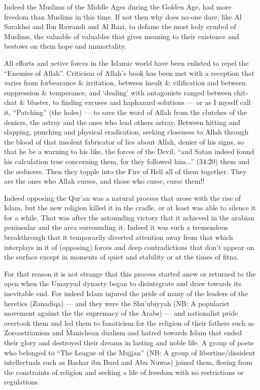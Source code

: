 \documentclass[12pt]{book}
\begin{document}
Indeed the Muslims of the Middle Ages during the Golden Age, had more freedom
than Muslims in this time. If not then why does no-one dare, like Al Sarakhsi
and Ibn Rawandi and Al Razi, to defame the most holy symbol of Muslims, the
valuable of valuables that gives meaning to their existence and bestows on them
hope and immortality.

All efforts and active forces in the Islamic world have been enlisted to repel
the “Enemies of Allah”. Criticism of Allah’s book has been met with a reception
that varies from forbearance \& irritation, between insult \& vilification and
between suppression \& temperance, and ‘dealing’ with antagonists ranged
between chit-chat \& bluster,
to finding excuses and haphazard solutions — or as
I myself call it, “Patching” (the holes) — to save the word of Allah from the
clutches of the deniers, the astray and the ones who lead others astray.
Between hitting and slapping, punching and physical eradication, seeking
closeness to Allah through the blood of that insolent fabricator of lies about
Allah, denier of his signs, so that he be a warning to his like, the forces of
the Devil, “and Satan indeed found his calculation true concerning them, for
they followed him...” (34:20) them and the seducers. Then they topple into the
Fire of Hell all of them together\footnotemark. They are the ones who Allah
curses, and those who curse, curse them!!


Indeed opposing the Qur’an was a natural process that arose with the rise of
Islam, but the new religion killed it in the cradle, or at least was able to
silence it for a while. That was after the astounding victory that it achieved
in the arabian peninsular and the area surrounding it. Indeed it was such a
tremendous breakthrough that it temporarily diverted attention away from that
which interplays in it of (opposing) forces and deep contradictions that don’t
appear on the surface except in moments of quiet and stability or at the times
of fitna.

For that reason it is not strange that this process started anew or returned to
the open when the Umayyad dynasty began to disintegrate and draw towards its
inevitable end. For indeed Islam injured the pride of many of the leaders of
the heretics (Zanadiqa) — and they were the Shu’ubiyyah
(NB: A popularist movement against the the supremacy of the Arabs)
— and nationalist pride overtook them and led them to fanaticism for the
religion of their fathers such as Zoroastrianism and Manichean dualism and
hatred towards Islam that ended their glory and destroyed their dreams in
lasting and noble life. A group of poets who belonged to “The League of the
Mujjan”
(NB: A group of libertine/dissident intellectuals such as Bashar ibn Burd and
Abu Nuwas)
joined them, fleeing from the constraints of religion
and seeking a life of freedom with no restrictions or regulations.
\end{document}
